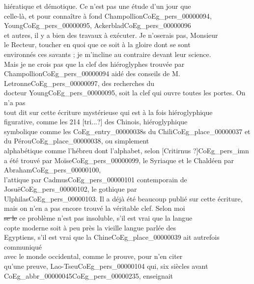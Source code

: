 \documentclass{book}
\begin{document}
hiératique et démotique. Ce n’est pas une étude d’un jour que\\
celle-là, et pour connaître à fond Champollion\gls{CoEg_pers_00000094}, Young\gls{CoEg_pers_00000095}, Ackerblad\gls{CoEg_pers_00000096}\\
et autres, il y a bien des travaux à exécuter. Je n’oserais pas, Monsieur\\
le Recteur, toucher en quoi que ce soit à la gloire dont se sont\\
environnés ces savants ; je m’incline au contraire devant leur science.\\
Mais je ne crois pas que la clef des hiéroglyphes trouvée par\\
Champollion\gls{CoEg_pers_00000094} aidé des conseils de M. Letronne\gls{CoEg_pers_00000097}, des recherches du\\
docteur Young\gls{CoEg_pers_00000095}, soit la clef qui ouvre toutes les portes. On n’a pas\\
tout dit sur cette écriture mystérieuse qui est à la fois hiéroglyphique\\
figurative, comme les 214 [tri...?] des Chinois, hiéroglyphique\\
symbolique comme les \glspl{CoEg_entry_00000038} du Chili\gls{CoEg_place_00000037} et du Pérou\gls{CoEg_place_00000038}, ou simplement\\
alphabétique comme l’hébreu dont l’alphabet, selon [Critirnus ?]\gls{CoEg_pers_imn}\\
a été trouvé par Moïse\gls{CoEg_pers_00000099}, le Syriaque et le Chaldéen par Abraham\gls{CoEg_pers_00000100},\\
l’attique par Cadmus\gls{CoEg_pers_00000101} contemporain de Josuë\gls{CoEg_pers_00000102}, le gothique par\\
Ulphilas\gls{CoEg_pers_00000103}. Il a déjà été beaucoup publié sur cette écriture,\\
mais on n’en a pas encore trouvé la véritable clef. Selon moi\\
\sout{se le} ce problème n’est pas insoluble, s’il est vrai que la langue\\
copte moderne soit à peu près la vieille langue parlée des\\
Egyptiens, s’il est vrai que la Chine\gls{CoEg_place_00000039} ait autrefois communiqué\\
avec le monde occidental, comme le prouve, pour n’en citer\\
qu’une preuve, Lao-Tseu\gls{CoEg_pers_00000104} qui, six siècles avant \gls{CoEg_abbr_00000045}\gls{CoEg_pers_00000235}, enseignait\\
\end{document}
